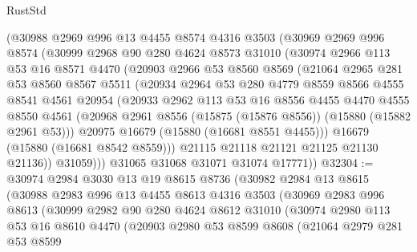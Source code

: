\begin{lexlean}{RustStd}
\begin{coremodule}
      (@30988
        @2969
        @996
        @13
        @4455
        @8574
        @4316
        @3503
        (@30969
          @2969
          @996
          @8574
          (@30999
            @2968
            @90
            @280
            @4624
            @8573
            @31010
            (@30974
              @2966
              @113
              @53
              @16
              @8571
              @4470
              (@20903
                @2966
                @53
                @8560
                @8569
                (@21064
                  @2965
                  @281
                  @53
                  @8560
                  @8567
                  @5511
                  (@20934
                    @2964
                    @53
                    @280
                    @4779
                    @8559
                    @8566
                    @4555
                    @8541
                    @4561
                    @20954
                    (@20933
                      @2962
                      @113
                      @53
                      @16
                      @8556
                      @4455
                      @4470
                      @4555
                      @8550
                      @4561
                      (@20968 @2961 @8556 (@15875 (@15876 @8556)) (@15880 (@15882 @2961 @53)))
                      @20975
                      @16679
                      (@15880 (@16681 @8551 @4455)))
                    @16679
                    (@15880 (@16681 @8542 @8559)))
                  @21115
                  @21118
                  @21121
                  @21125
                  @21130
                  @21136))
              @31059)))
        @31065
        @31068
        @31071
        @31074
        @17771))
@32304 := @30974
    @2984
    @3030
    @13
    @19
    @8615
    @8736
    (@30982
      @2984
      @13
      @8615
      (@30988
        @2983
        @996
        @13
        @4455
        @8613
        @4316
        @3503
        (@30969
          @2983
          @996
          @8613
          (@30999
            @2982
            @90
            @280
            @4624
            @8612
            @31010
            (@30974
              @2980
              @113
              @53
              @16
              @8610
              @4470
              (@20903
                @2980
                @53
                @8599
                @8608
                (@21064
                  @2979
                  @281
                  @53
                  @8599

\end{coremodule}
\end{lexlean}
